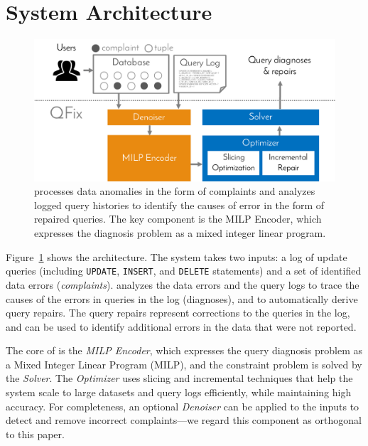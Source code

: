 \section{{\sys} System Architecture}



\begin{figure}[t]
    \centering
        \includegraphics[scale=0.35]{figures/architecture}
    \caption{\sys processes data anomalies in the form of complaints and analyzes logged query histories to identify the causes of error in the form of repaired queries. 
    The key component is the MILP Encoder, which expresses the diagnosis problem as a mixed integer linear program.}
    \label{fig:architecture}
\end{figure}

Figure~\ref{fig:architecture} shows the \sys architecture. The system takes
two inputs: a log of update queries (including \texttt{UPDATE}, \texttt{INSERT}, and \texttt{DELETE}
statements) and a set of identified data errors (\emph{complaints}). \sys
analyzes the data errors and the query logs to trace the causes of the errors
in queries in the log (diagnoses), and to automatically derive query repairs.
The query repairs represent corrections to the queries in the log, and can be
used to identify additional errors in the data that were not reported.
 
The core of \sys is the \emph{MILP Encoder}, which expresses the query diagnosis
problem as a Mixed Integer Linear Program (MILP), and the constraint problem is solved by the \emph{Solver}. 
The \emph{Optimizer} uses slicing and incremental techniques that
help the system scale to large datasets and query logs efficiently, while maintaining high accuracy. 
For completeness, an optional \emph{Denoiser} can be applied to the inputs to detect and remove incorrect complaints---we regard this component as orthogonal to this paper.




